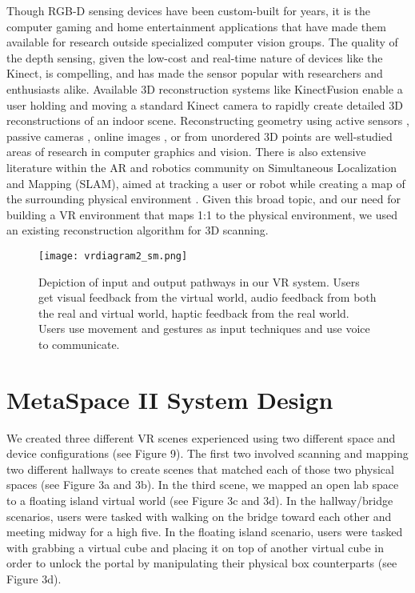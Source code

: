 \documentclass{sigchi}
\begin{document}
Though RGB-D sensing devices have been custom-built for years, it is the computer gaming and home entertainment applications that have made them available for research outside specialized computer vision groups. The quality of the depth sensing, given the low-cost and real-time nature of devices like the Kinect, is compelling, and has made the sensor popular with researchers and enthusiasts alike. Available 3D reconstruction systems like KinectFusion \cite{izadi2011kinectfusion} enable a user holding and moving a standard Kinect camera to rapidly create detailed 3D reconstructions of an indoor scene. Reconstructing geometry using active sensors \cite{levoy2000digital}, passive cameras \cite{hartley2003multiple,merrell2007real}, online images \cite{frahm2010building}, or from unordered 3D points \cite{kazhdan2006poisson} are well-studied areas of research in computer graphics and vision. There is also extensive literature within the AR and robotics community on Simultaneous Localization and Mapping (SLAM), aimed at tracking a user or robot while creating a map of the surrounding physical environment \cite{thrun2002robotic}. Given this broad topic, and our need for building a VR environment that maps 1:1 to the physical environment, we used an existing reconstruction algorithm for 3D scanning. 

\begin{figure}[!t]
\centering
\texttt{[image: vrdiagram2\_sm.png]}
\caption{Depiction of input and output pathways in our VR system. Users get visual feedback from the virtual world, audio feedback from both the real and virtual world, haptic feedback from the real world. Users use movement and gestures as input techniques and use voice to communicate.  }
\label{fig:setup}
\end{figure}

\section{MetaSpace II System Design}

We created three different VR scenes experienced using two different space and device configurations (see Figure 9). The first two involved scanning and mapping two different hallways to create scenes that matched each of those two physical spaces (see Figure 3a and 3b). In the third scene, we mapped an open lab space to a floating island virtual world (see Figure 3c and 3d). In the hallway/bridge scenarios, users were tasked with walking on the bridge toward each other and meeting midway for a high five. In the floating island scenario, users were tasked with grabbing a virtual cube and placing it on top of another virtual cube in order to unlock the portal by manipulating their physical box counterparts (see Figure 3d). 
\end{document}
